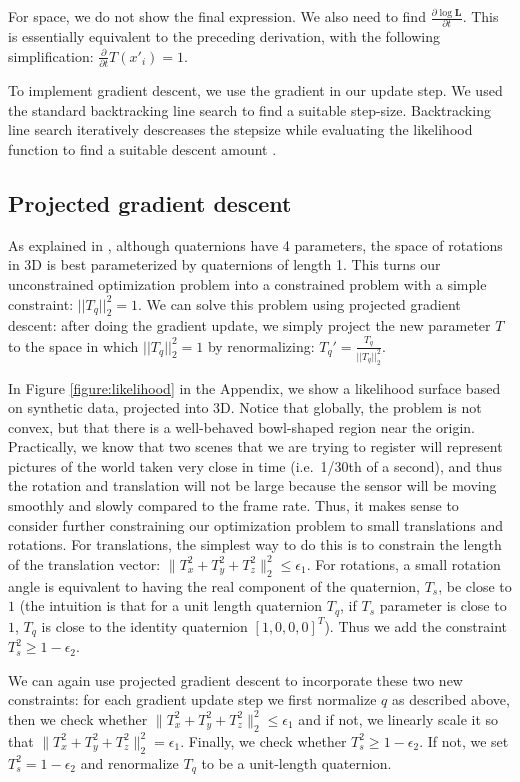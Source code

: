 \documentclass{article} %
\begin{document}
For space, we do not show the final expression. We also need to find $\frac{\partial \log \mathbf{L}}{\partial t}$. This is essentially
equivalent to the preceding derivation, with the following simplification: $\frac{\partial }{\partial t} T(x'_i) = 1$.

To implement gradient descent, we use the gradient in our update step. We used the standard backtracking line search to find a suitable step-size. Backtracking line search iteratively descreases the stepsize while evaluating the likelihood function to find a suitable descent amount \cite[p. 464]{boyd2004convex}.

\subsection{Projected gradient descent}
As explained in \cite{wheeler1995}, although quaternions have 4 parameters, the space of rotations in 3D is best parameterized by quaternions of length 1. This turns our unconstrained optimization problem into a constrained problem with a simple constraint: $||T_q||^2_2 = 1$. We can solve this problem using projected gradient descent: after doing the gradient update, we simply project the new parameter $T$ to the space in which $||T_q||^2_2 = 1$
by renormalizing: $T_q' = \frac{T_q}{||T_q||^2_2}$.

In Figure \ref{figure:likelihood} in the Appendix, we show a likelihood surface based on synthetic data, projected into 3D. Notice that globally, the problem is not convex, but that there is a well-behaved bowl-shaped region near the origin. Practically, we know that two scenes that we are trying to register will represent pictures of the world taken very close in time (i.e.~1/30th of a second), and thus the rotation and translation will not be large because the sensor will be moving smoothly and slowly compared to the frame rate. Thus, it makes sense to consider further constraining our optimization problem to small translations and rotations. For translations, the simplest way to do this is to constrain the length of the translation vector: $\|T_x^2 + T_y^2 + T_z^2\|^2_2 \leq \epsilon_1$. For rotations, a small rotation angle is equivalent to having the real component of the quaternion, $T_s$, be close to $1$ \cite{wheeler1995} (the intuition is that for a unit length quaternion $T_q$, if $T_s$ parameter is close to $1$, $T_q$ is close to the identity quaternion $[1, 0, 0, 0]^T$). Thus we add the constraint $T_s^2 \geq 1-\epsilon_2$.

We can again use projected gradient descent to incorporate these two new constraints: for each gradient update step we first normalize $q$ as described above, then we check whether $\|T_x^2 + T_y^2 + T_z^2\|^2_2 \leq \epsilon_1$ and if not, we linearly scale it so that $\|T_x^2 + T_y^2 + T_z^2\|^2_2 = \epsilon_1$. Finally, we check whether $T_s^2 \geq 1-\epsilon_2$. If not, we set $T_s^2 = 1-\epsilon_2$ and renormalize $T_q$ to be a unit-length quaternion. 
\end{document}
